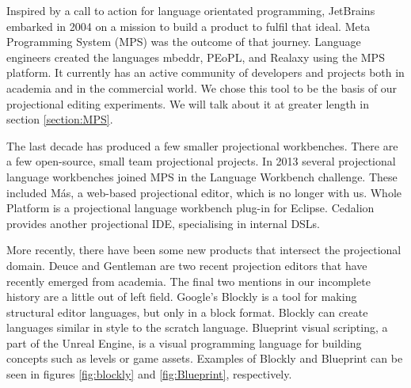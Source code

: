 Inspired by a call to action for language orientated programming\cite{dmitriev2004language}, JetBrains embarked in 2004 on a mission to build a product to fulfil that ideal.  
Meta Programming System (MPS) was the outcome of that journey.   
Language engineers created the languages mbeddr, PEoPL, and Realaxy using the MPS platform.  
It currently has an active community of developers and projects both in academia and in the commercial world. 
We chose this tool to be the basis of our projectional editing experiments. 
We will talk about it at greater length in section \ref{section:MPS}.

The last decade has produced a few smaller projectional workbenches.
There are a few open-source, small team projectional projects. 
In 2013 several projectional language workbenches joined MPS in the Language Workbench challenge\cite{erdweg2015evaluating}.
These included M\'as, a web-based projectional editor, which is no longer with us\cite{MasPostMortem}.
Whole Platform\cite{WholePlatformProductPage} is a projectional language workbench plug-in for Eclipse.
Cedalion\cite{lorenz2011cedalion} provides another projectional IDE, specialising in internal DSLs.

More recently, there have been some new products that intersect the projectional domain.
Deuce\cite{hempel2018deuce} and Gentleman\cite{lafontant2020gentleman_SLR} are two recent projection editors that have recently emerged from academia.
The final two mentions in our incomplete history are a little out of left field. 
Google's Blockly\cite{Blockly_ProductPage} is a tool for making structural editor languages, but only in a block format.
Blockly can create languages similar in style to the scratch language. 
Blueprint visual scripting, a part of the Unreal Engine, is a visual programming language for building concepts such as levels or game assets.
Examples of Blockly and Blueprint can be seen in figures \ref{fig:blockly} and \ref{fig:Blueprint}, respectively.

